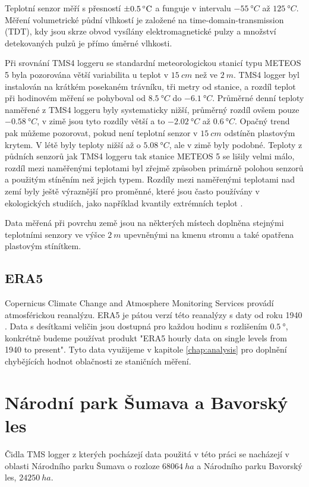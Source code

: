 Teplotní senzor měří s přesností $\SI{\pm 0.5}{\degree C}$ a funguje v intervalu $\SI{-55}{\degree C}$ až $\SI{125}{\degree C}$. Měření volumetrické půdní vlhkostí je založené na time-domain-transmission (TDT), kdy jsou skrze obvod vysílány elektromagnetické pulzy a množství detekovaných pulzů je přímo úměrné vlhkosti. 

Při srovnání TMS4 loggeru se standardní meteorologickou stanicí typu METEOS 5 byla pozorována větší variabilita u teplot v $\SI{15}{cm}$ než ve $\SI{2}{m}$. TMS4 logger byl instalován na krátkém posekaném trávníku, tři metry od stanice, a rozdíl teplot při hodinovém měření se pohyboval od $\SI{+8.5}{\degree C}$ do $\SI{-6.1}{\degree C}$. Průměrné denní teploty naměřené z TMS4 loggeru byly systematicky nižší, průměrný rozdíl ovšem pouze $\SI{-0.58}{\degree C}$, v zimě jsou tyto rozdíly větší a to $\SI{-2.02}{\degree C}$ až $\SI{0.6}{\degree C}$. Opačný trend pak můžeme pozorovat, pokud není teplotní senzor v $\SI{15}{cm}$ odstíněn plastovým krytem. V létě byly teploty nižší až o $\SI{5.08}{\degree C}$, ale v zimě byly podobné. Teploty z půdních senzorů jak TMS4 loggeru tak stanice METEOS 5 se lišily velmi málo, rozdíl mezi naměřenými teplotami byl zřejmě způsoben primárně polohou senzorů a použitým stíněním než jejich typem. Rozdíly mezi naměřenými teplotami nad zemí byly ještě výraznější pro proměnné, které jsou často používány v ekologických studiích, jako například kvantily extrémních teplot \parencite{WildJan2019Caer}. 

Data měřená při povrchu země jsou na některých místech doplněna stejnými teplotními senzory ve výšce $\SI{2}{m}$ upevněnými na kmenu stromu a také opatřena plastovým stínítkem.

\subsection{ERA5}\label{chap:era5}
Copernicus Climate Change and Atmosphere Monitoring Services provádí atmosférickou reanalýzu. ERA5 je pátou verzí této reanalýzy s daty od roku 1940 \parencite{era5}. Data s desítkami veličin jsou dostupná pro každou hodinu s rozlišením $\SI{0.5}{\degree}$, konkrétně budeme používat produkt "ERA5 hourly data on single levels from 1940 to present". Tyto data využijeme v kapitole \ref{chap:analysis} pro doplnění chybějících hodnot oblačnosti ze staničních měření.

\section{Národní park Šumava a Bavorský les} \label{chap:sumavabavorskyles}
Čidla TMS logger z kterých pocházejí data použitá v této práci se nacházejí v oblasti Národního parku Šumava o rozloze $\SI{68 064}{ha}$ \parencite{npsumava} a Národního parku Bavorský les, $\SI{24 250}{ha}$.

